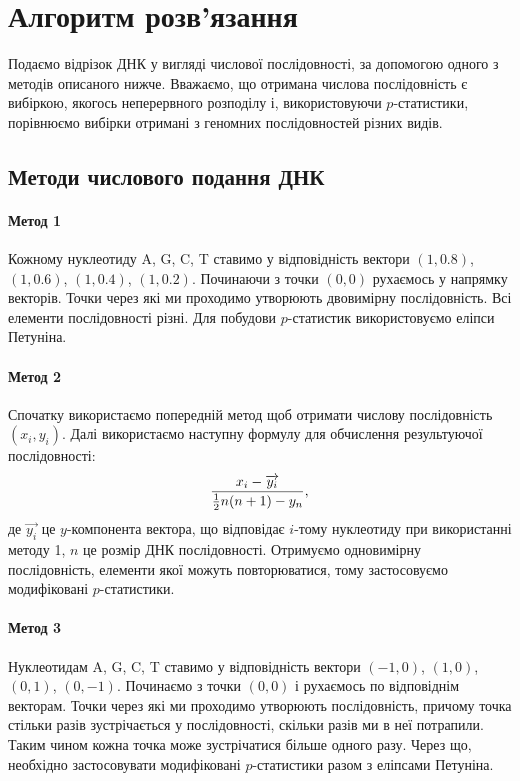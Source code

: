 \documentclass[14pt,a4paper,titlepage]{extarticle}
\begin{document}
\section{Алгоритм розв’язання}
Подаємо відрізок ДНК у вигляді числової послідовності, за допомогою одного з
методів описаного нижче. Вважаємо, що отримана числова послідовність є вибіркою,
якогось неперервного розподілу і, використовуючи $p$-статистики, порівнюємо
вибірки отримані з геномних послідовностей різних видів.

\subsection{Методи числового подання ДНК}

\paragraph{Метод 1}
Кожному нуклеотиду A, G, C, T ставимо у відповідність вектори $(1,0.8)$,
$(1,0.6)$, $(1,0.4)$, $(1,0.2)$. Починаючи з точки $(0,0)$ рухаємось у напрямку
векторів. Точки через які ми проходимо утворюють двовимірну послідовність.
Всі елементи послідовності різні.
Для побудови $p$-статистик використовуємо еліпси Петуніна.
\paragraph{Метод 2}
Спочатку використаємо попередній метод щоб отримати числову послідовність
$(x_i,y_i)$. Далі використаємо наступну формулу для обчислення результуючої
послідовності:
\[{x_i-\overrightarrow{y_i} \over{{1\over2}n(n+1)-y_n}},\]
де $\overrightarrow{y_i}$ це $y$-компонента вектора, що відповідає $i$-тому нуклеотиду при використанні методу 1, $n$ це розмір ДНК послідовності.
Отримуємо одновимірну послідовність, елементи якої можуть повторюватися, тому
застосовуємо модифіковані $p$-статистики.
\paragraph{Метод 3}
Нуклеотидам A, G, C, T ставимо у відповідність вектори $(-1,0)$, $(1,0)$,
$(0,1)$, $(0,-1)$. Починаємо з точки $(0,0)$ і рухаємось по відповіднім
векторам. Точки через які ми проходимо утворюють послідовність, причому точка
стільки разів зустрічається у послідовності, скільки разів ми в неї потрапили.
Таким чином кожна точка може зустрічатися більше одного разу.
Через що, необхідно застосовувати модифіковані $p$-статистики разом з еліпсами
Петуніна.
\end{document}
